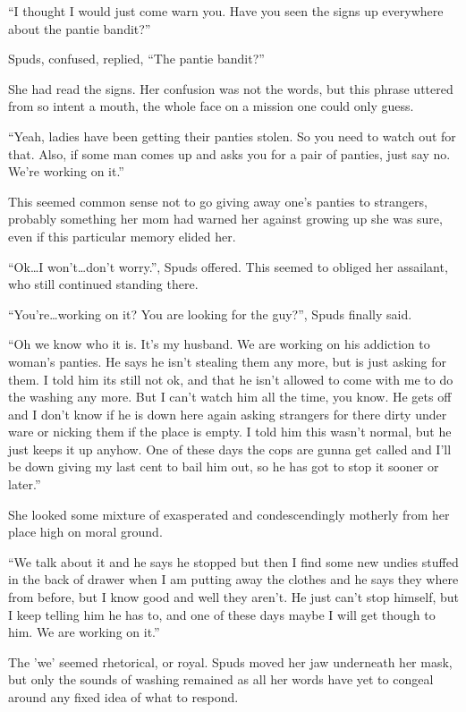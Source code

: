 \documentclass[ebook, 10pt, openright, onecolumn]{memoir}
\begin{document}
``I thought I would just come warn you.  Have you seen the signs up everywhere
about the pantie bandit?''

Spuds, confused, replied, ``The pantie bandit?''

She had read the signs.  Her confusion was not the words, but this phrase uttered
from so intent a mouth, the whole face on a mission one could only guess.

``Yeah, ladies have been getting their panties stolen.  So you need to watch out
for that. Also, if some man comes up and asks you for a pair of panties, just
say no. We're working on it.''

This seemed common sense not to go giving away one's panties to strangers,
probably something her mom had warned her against growing up she was sure, even
if this particular memory elided her.

``Ok\ldots I won't\ldots don't worry.'', Spuds offered. This seemed to obliged
her assailant, who still continued standing there.

``You're\ldots working on it? You are looking for the guy?'', Spuds finally said.

``Oh we know who it is. It's my husband.  We are working on his addiction to
woman's panties.  He says he isn't stealing them any more, but is just asking
for them.   I told him its still not ok, and that he isn't allowed to come with
me to do the washing any more. But I can't watch him all the time, you know.  He
gets off and I don't know if he is down here again asking strangers for there
dirty under ware or nicking them if the place is empty.  I told him this wasn't
normal, but he just keeps it up anyhow.  One of these days the cops are gunna
get called and I'll be down giving my last cent to bail him out, so he has got
to stop it sooner or later.''

She looked some mixture of exasperated and condescendingly motherly from her
place high on moral ground.

``We talk about it and he says he stopped but then I find some new undies stuffed
in the back of drawer when I am putting away the clothes and he says they where
from before, but I know good and well they aren't.  He just can't stop himself,
but I keep telling him he has to, and one of these days maybe I will get though
to him.  We are working on it.''

The 'we' seemed rhetorical, or royal.  Spuds moved her jaw underneath her mask,
but only the sounds of washing remained as all her words have yet to congeal
around any fixed idea of what to respond.
\end{document}

